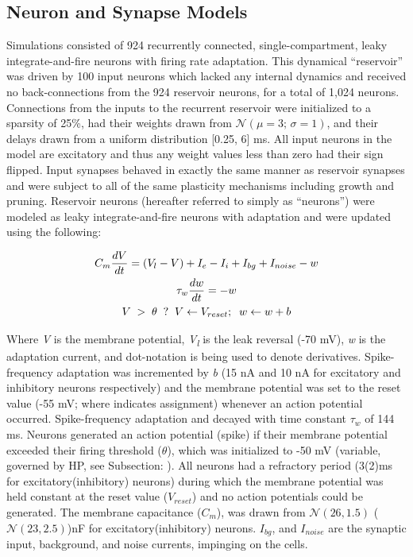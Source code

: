 \documentclass[10pt,letterpaper]{article}
\begin{document}
\subsection*{Neuron and Synapse Models}

Simulations consisted of 924 recurrently connected, single-compartment, leaky integrate-and-fire neurons with firing rate adaptation.  This dynamical ``reservoir'' was driven by 100 input neurons which lacked any internal dynamics and received no back-connections from the 924 reservoir neurons, for a total of 1,024 neurons. Connections from the inputs to the recurrent reservoir were initialized to a sparsity of 25\%, had their weights drawn from $\mathcal{N}(\mu = 3;\,\sigma = 1)$, and their delays drawn from a uniform distribution [0.25, 6] ms. All input neurons in the model are excitatory and thus any weight values less than zero had their sign flipped. Input synapses behaved in exactly the same manner as reservoir synapses and were subject to all of the same plasticity mechanisms including growth and pruning. Reservoir neurons (hereafter referred to simply as ``neurons'') were modeled as leaky integrate-and-fire neurons with adaptation and were updated using the following:

\begin{gather}
C_m \frac{dV}{dt} = (V_l - V) + I_e - I_i + I_{bg} + I_{noise} - w \notag  \\
\tau_w \frac{dw}{dt} =  -w \\
V \;>\; \theta \;\;?\;\; V \leftarrow V_{reset}; \;\; w \leftarrow w + b  \notag
\label{mainNeuronEq}
\end{gather}

Where \emph{V} is the membrane potential, \emph{V\textsubscript{l}} is the leak reversal (-70 mV), \emph{w} is the adaptation current, and dot-notation is being used to denote derivatives. Spike-frequency adaptation was incremented by \emph{b} (15 nA and 10 nA for excitatory and inhibitory neurons respectively) and the membrane potential was set to the reset value (-55 mV; where \textleftarrow indicates assignment) whenever an action potential occurred. Spike-frequency adaptation and decayed with time constant $\tau_w$ of 144 ms. Neurons generated an action potential (spike) if their membrane potential exceeded their firing threshold ($\theta$), which was initialized to -50 mV (variable, governed by HP, see Subsection: ). All neurons had a refractory period (3(2)ms for excitatory(inhibitory) neurons) during which the membrane potential was held constant at the reset value ($V_{reset}$) and no action potentials could be generated. The membrane capacitance ($C_m$), was drawn from $\mathcal{N}(26, 1.5)$ ($\mathcal{N}(23, 2.5)$)nF for excitatory(inhibitory) neurons. $ I_{bg}$, and $I_{noise}$ are the synaptic input, background, and noise currents, impinging on the cells. 
\end{document}
